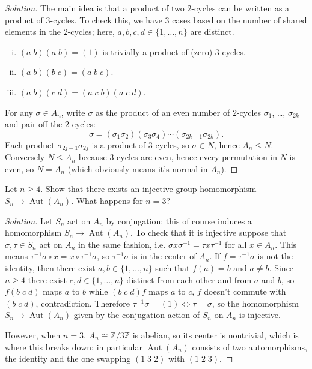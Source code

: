\documentclass[10pt]{article}
\providecommand{\ZZ}{\mathbb Z}
\providecommand{\ii}{\item}
\providecommand{\inv}{^{-1}}
\newenvironment{soln}{\begin{proof}[Solution]}{\end{proof}}
\providecommand{\aut}{\operatorname{Aut}}
\begin{document}
\begin{soln}
    The main idea is that a product of two $2$-cycles can be written as
    a product of $3$-cycles. To check this, we have $3$ cases
    based on the number of shared elements in the $2$-cycles;
    here, $a,b,c,d\in\{1,\dots,n\}$ are distinct.
    \begin{enumerate}[(i)]
        \ii $(a\; b)(a\; b) = (1)$ is trivially a product of (zero) $3$-cycles.
	\ii $(a\; b)(b\; c) = (a\; b\; c)$.
	\ii $(a\; b)(c\; d) = (a\; c\; b)(a\; c\; d)$.
    \end{enumerate}
    For any $\sigma\in A_n$, write $\sigma$ as the product of
    an even number of $2$-cycles $\sigma_1$, \dots, $\sigma_{2k}$
    and pair off the $2$-cycles:
    \begin{equation*}
	\sigma = (\sigma_1\sigma_2)(\sigma_3\sigma_4)\cdots(\sigma_{2k-1}\sigma_{2k}).
    \end{equation*}
    Each product $\sigma_{2j-1}\sigma_{2j}$ is a product of $3$-cycles,
    so $\sigma\in N$, hence $A_n\le N$.
    Conversely $N\le A_n$ because $3$-cycles are even, hence
    every permutation in $N$ is even, so $N = A_n$
    (which obviously means it's normal in $A_n$).
\end{soln}

\begin{problem}
    Let $n\ge 4$. Show that there exists an injective group homomorphism
    $S_n\to\aut(A_n)$. What happens for $n = 3$?
\end{problem}

\begin{soln}
    Let $S_n$ act on $A_n$ by conjugation;
    this of course induces a homomorphism $S_n\to\aut(A_n)$.
    To check that it is injective suppose that $\sigma,\tau\in S_n$
    act on $A_n$ in the same fashion, i.e. $\sigma x\sigma\inv = \tau x\tau\inv$
    for all $x\in A_n$. This means $\tau\inv\sigma\circ x = x\circ\tau\inv\sigma$,
    so $\tau\inv\sigma$ is in the center of $A_n$.
    If $f=\tau\inv\sigma$ is not the identity, then there exist $a,b\in\{1,\dots,n\}$
    such that $f(a) = b$ and $a\ne b$.
    Since $n\ge 4$ there exist $c,d\in\{1,\dots,n\}$
    distinct from each other and from $a$ and $b$, so
    $f(b\;c\; d)$ maps $a$ to $b$ while $(b\; c\; d)f$ maps $a$ to $c$,
    $f$ doesn't commute with $(b\;c\; d)$, contradiction.
    Therefore $\tau\inv\sigma = (1)\iff \tau = \sigma$,
    so the homomorphism $S_n\to\aut(A_n)$
    given by the conjugation action of $S_n$ on $A_n$
    is injective.

    However, when $n=3$, $A_n\cong \ZZ/3\ZZ$ is abelian,
    so its center is nontrivial, which is where this breaks down;
    in particular $\aut(A_n)$ consists of two automorphisms,
    the identity and the one swapping $(1\;3\;2)$ with $(1\;2\;3)$.
\end{soln}
\end{document}
